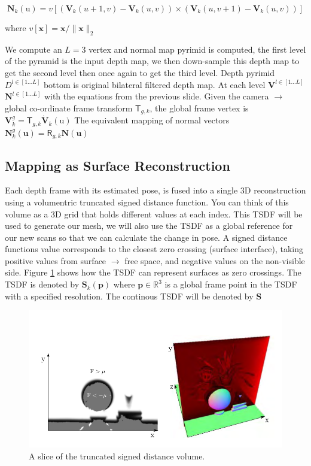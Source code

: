 \documentclass[10pt, twocolumn]{article}
\begin{document}
\begin{equation}
\mathbf{N}_k(\mathrm{u}) = v[(\mathbf{V}_k(u+1,v) - \mathbf{V}_k(u, v)) \times (\mathbf{V}_k(u,v+1) - \mathbf{V}_k(u,v))]
\end{equation}

 where $v[\mathbf{x}] = \mathbf{x} / \| \mathbf{x} \|_{2}$

We compute an $L = 3$ vertex and normal map pyrimid is computed, the first level of the pyramid is the input depth map, we then down-sample this depth map to get the second level then once again to get the third level. 
Depth pyrimid $D^{l \in[1\dots L]}$ bottom is original bilateral filtered depth map. 
At each level $\textbf{V}^{l \in[1\dots L]}$ $\textbf{N}^{l \in[1\dots L]}$ with the equations from the previous slide.
Given the camera $\rightarrow$ global co-ordinate frame transform $\mathsf{T}_{g,k}$, the global frame vertex is $\textbf{V}^{g}_{k} = \mathsf{T}_{g,k} \dot{\textbf{V}}_{k}(\mathrm{u})$
The equivalent mapping of normal vectors $\mathbf{N}^{g}_{k}(\mathbf{u}) = \mathsf{R}_{g,k}\mathbf{N}(\mathbf{u})$

\subsection{Mapping as Surface Reconstruction}
Each depth frame with its estimated pose, is fused into a single 3D reconstruction using a volumentric truncated signed distance function. You can think of this volume as a 3D grid that holds different values at each index. 
This TSDF will be used to generate our mesh, we will also use the TSDF as a global reference for our new scans so that we can calculate the change in pose. 
A signed distance functions value corresponds to the closest zero crossing (surface interface), taking positive values from surface $\rightarrow$ free space, and negative values on the non-visible side. Figure \ref{fig:tsdfslice} shows how the TSDF can represent surfaces as zero crossings.
The TSDF is denoted by $\mathbf{S}_{k}(\mathbf{p})$ where $\mathbf{p} \in \mathbb{R}^{3}$ is a global frame point in the TSDF with a specified resolution. The continous TSDF will be denoted by $\mathbf{S}$

\begin{figure}
  \centering
  \includegraphics[width=0.8\linewidth]{tsdf}
  \caption{A slice of the truncated signed distance volume.}
  \label{fig:tsdfslice}
\end{figure}
\end{document}
